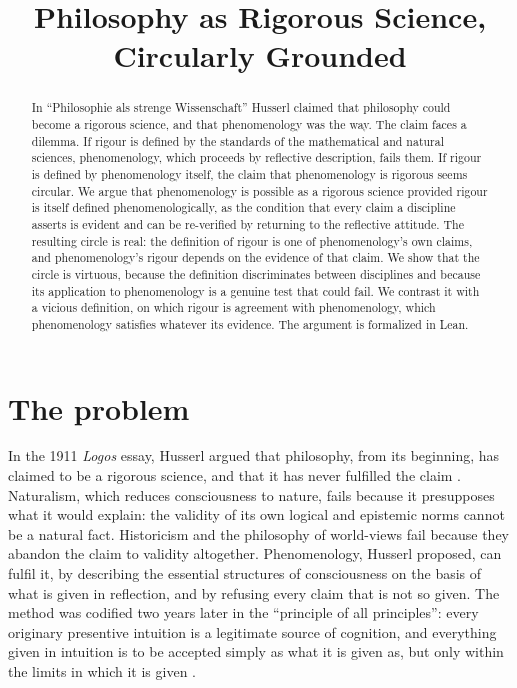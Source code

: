 \documentclass{situationist-preprint}
\title{Philosophy as Rigorous Science, Circularly Grounded}
\begin{document}
\maketitle

\begin{abstract}
In \enquote{Philosophie als strenge Wissenschaft} Husserl claimed that philosophy could become a rigorous science, and that phenomenology was the way. The claim faces a dilemma. If rigour is defined by the standards of the mathematical and natural sciences, phenomenology, which proceeds by reflective description, fails them. If rigour is defined by phenomenology itself, the claim that phenomenology is rigorous seems circular. We argue that phenomenology is possible as a rigorous science provided rigour is itself defined phenomenologically, as the condition that every claim a discipline asserts is evident and can be re-verified by returning to the reflective attitude. The resulting circle is real: the definition of rigour is one of phenomenology's own claims, and phenomenology's rigour depends on the evidence of that claim. We show that the circle is virtuous, because the definition discriminates between disciplines and because its application to phenomenology is a genuine test that could fail. We contrast it with a vicious definition, on which rigour is agreement with phenomenology, which phenomenology satisfies whatever its evidence. The argument is formalized in Lean.
\end{abstract}

\section{The problem}

In the 1911 \emph{Logos} essay, Husserl argued that philosophy, from its beginning, has claimed to be a rigorous science, and that it has never fulfilled the claim \citep{Husserl1911}. Naturalism, which reduces consciousness to nature, fails because it presupposes what it would explain: the validity of its own logical and epistemic norms cannot be a natural fact. Historicism and the philosophy of world-views fail because they abandon the claim to validity altogether. Phenomenology, Husserl proposed, can fulfil it, by describing the essential structures of consciousness on the basis of what is given in reflection, and by refusing every claim that is not so given. The method was codified two years later in the \enquote{principle of all principles}: every originary presentive intuition is a legitimate source of cognition, and everything given in intuition is to be accepted simply as what it is given as, but only within the limits in which it is given \citep[§24]{Husserl1913}.
\end{document}
